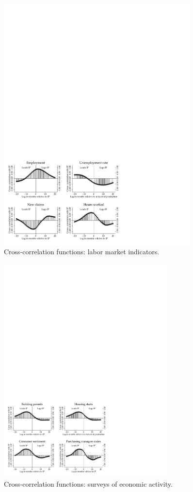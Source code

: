 \begin{figure}
    \caption{Cross-correlation functions:  labor market indicators.}
    \label{fig:ccf-labor}%
    \centering
    \includegraphics[width=0.9\textwidth]{Figures/xclabor.pdf}
\end{figure}

\begin{figure}
     \caption{Cross-correlation functions:  surveys of economic activity.}
    \label{fig:ccf-survey}%
    \centering
    \includegraphics[width=0.8\textwidth]{Figures/xcsurvey.pdf}
\end{figure}


